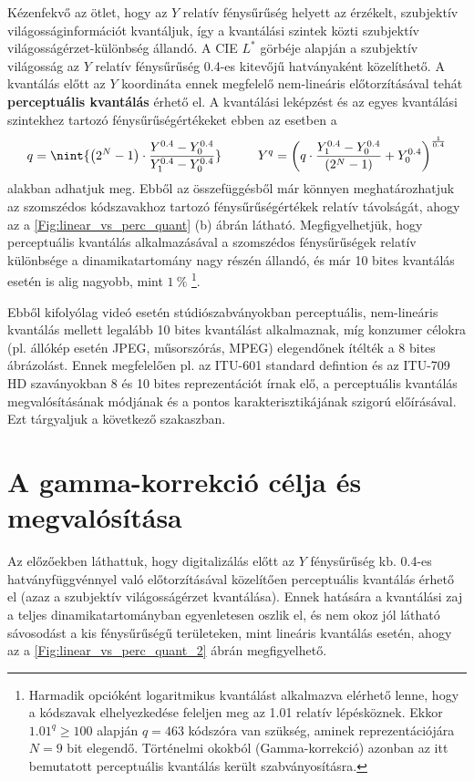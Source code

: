 Kézenfekvő az ötlet, hogy az $Y$ relatív fénysűrűség helyett az érzékelt, szubjektív világosságinformációt kvantáljuk, így a kvantálási szintek közti szubjektív világosságérzet-különbség állandó.
A CIE $L^*$ görbéje alapján a szubjektív világosság az $Y$ relatív fénysűrűség 0.4-es kitevőjű hatványaként közelíthető.
A kvantálás előtt az $Y$ koordináta ennek megfelelő nem-lineáris előtorzításával tehát \textbf{perceptuális kvantálás} érhető el.
A kvantálási leképzést és az egyes kvantálási szintekhez tartozó fénysűrűségértékeket ebben az esetben a
\begin{equation}
q =  \nint{ \left( 2^N - 1 \right) \cdot  \frac{Y^{0.4} - Y_0^{0.4} }{Y_1^{0.4} - Y_0^{0.4}} }
\hspace{1cm}
Y^q = \left( q \cdot \frac{Y_1^{0.4} - Y_0^{0.4}}{\left( 2^N - 1 \right) } + Y_0^{0.4} \right)^{\frac{1}{0.4}} 
\end{equation}
alakban adhatjuk meg.
Ebből az összefüggésből már könnyen meghatározhatjuk az szomszédos kódszavakhoz tartozó fénysűrűségértékek relatív távolságát, ahogy az a \ref{Fig:linear_vs_perc_quant} (b) ábrán látható.
Megfigyelhetjük, hogy perceptuális kvantálás alkalmazásával a szomszédos fénysűrűségek relatív különbsége a dinamikatartomány nagy részén állandó, és már 10 bites kvantálás esetén is alig nagyobb, mint $1~\%$ \footnote{Harmadik opcióként logaritmikus kvantálást alkalmazva elérhető lenne, hogy a kódszavak elhelyezkedése feleljen meg az 1.01 relatív lépésköznek.
Ekkor $1.01^q \geq 100$ alapján $q = 463$ kódszóra van szükség, aminek reprezentációjára $N=9$ bit elegendő.
Történelmi okokból (Gamma-korrekció) azonban az itt bemutatott perceptuális kvantálás került szabványosításra.}.

Ebből kifolyólag videó esetén stúdiószabványokban perceptuális, nem-lineáris kvantálás mellett legalább 10 bites kvantálást alkalmaznak, míg konzumer célokra (pl. állókép esetén JPEG, műsorszórás, MPEG) elegendőnek ítélték a  8 bites ábrázolást.
Ennek megfelelően pl. az ITU-601 standard defintion és az ITU-709 HD szaványokban 8 és 10 bites reprezentációt írnak elő, a perceptuális kvantálás megvalósításának módjának és a pontos karakterisztikájának szigorú előírásával.
Ezt tárgyaljuk a következő szakaszban.

\section{A gamma-korrekció célja és megvalósítása}

Az előzőekben láthattuk, hogy digitalizálás előtt az $Y$ fénysűrűség kb. 0.4-es hatványfüggvénnyel való előtorzításával közelítően perceptuális kvantálás érhető el (azaz a szubjektív világosságérzet kvantálása).
Ennek hatására a kvantálási zaj a teljes dinamikatartományban egyenletesen oszlik el, és nem okoz jól látható sávosodást a kis fénysűrűségű területeken, mint lineáris kvantálás esetén, ahogy az a \ref{Fig:linear_vs_perc_quant_2} ábrán megfigyelhető.

